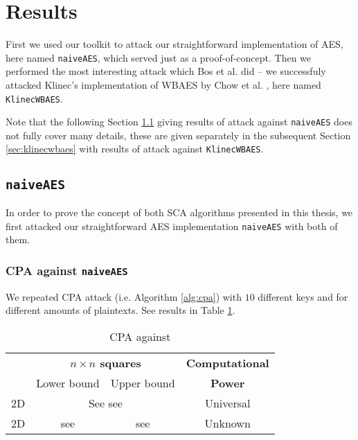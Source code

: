 \section{Results}
\label{sec:results}

First we used our toolkit to attack our straightforward implementation of AES, here named {\tt naiveAES}, which served just as a proof-of-concept. Then we performed the most interesting attack which Bos et al. \cite{bos2015differential} did -- we successfuly attacked Klinec's implementation \cite{klinec2013implementation} of WBAES by Chow et al. \cite{chow2003aes}, here named {\tt KlinecWBAES}.

Note that the following Section \ref{sec:naiveaes} giving results of attack against {\tt naiveAES} does not fully cover many details, these are given separately in the subsequent Section \ref{sec:klinecwbaes} with results of attack against {\tt KlinecWBAES}.



\subsection{\tt naiveAES}
\label{sec:naiveaes}

In order to prove the concept of both SCA algorithms presented in this thesis, we first attacked our straightforward AES implementation {\tt naiveAES} with both of them.

\subsubsection{CPA against {\tt naiveAES}}
	
	We repeated CPA attack (i.e. Algorithm \ref{alg:cpa}) with $10$ different keys and for different amounts of plaintexts. See results in Table \ref{tab:naiveaes}.
	
	\begin{table}[H]
		\begin{center}
		\begin{tabular}{| c | c | c | c |}
			\hline
			~ & \multicolumn{2}{c|}{\bf $n\times n$ squares} & {\bf Computational} \\
			~ & \multicolumn{1}{c}{Lower bound} & \multicolumn{1}{c|}{Upper bound} & {\bf Power}\\
			\hline
			2D & \multicolumn{2}{c|}{See see} & Universal \\
			\hline
			2D & see & see & Unknown \\
			\hline
		\end{tabular}
		\end{center}
	\caption{CPA against }
	\label{tab:naiveaes}
	\end{table}

